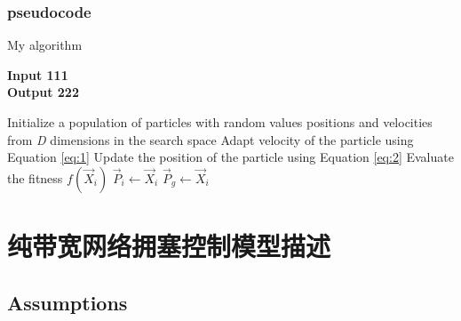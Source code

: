 \documentclass[UTF8,a4paper, 12pt]{ctexart}
\begin{document}
\subsubsection{pseudocode} 




\begin{algorithm}
	\caption{My algorithm}\label{euclid}
	 \hspace*{\algorithmicindent} \textbf{Input 111} \\
	\hspace*{\algorithmicindent} \textbf{Output 222} 
\begin{algorithmic}[1]
	\State Initialize a population of particles with random values positions
	and velocities from \textit{D} dimensions in the search space
	\State Adapt velocity of the particle using Equation \ref{eq:1}
	\State Update the position of the particle using Equation \ref{eq:2}
	\State Evaluate the fitness {$f(\overrightarrow{X}_i)$}
	\State $\overrightarrow{P}_i \gets \overrightarrow{X}_i$
	\EndIf
	\State $\overrightarrow{P}_g \gets \overrightarrow{X}_i$
	\EndIf
	\EndFor
	\EndWhile
\end{algorithmic}
\end{algorithm}
\section{纯带宽网络拥塞控制模型描述}
\subsection{Assumptions}
\end{document}
